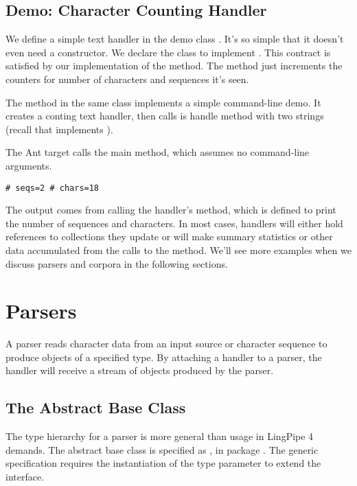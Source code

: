 \subsection{Demo: Character Counting Handler}

We define a simple text handler in the demo class
.  It's so simple that it doesn't
even need a constructor.
%
%
We declare the class to implement .
This contract is satisfied by our implementation of the
 method.  The method just increments the
counters for number of characters and sequences it's seen.

The  method in the same class implements a simple
command-line demo.  It creates a conting text handler, then calls is
handle method with two strings (recall that  implements
).
%

The Ant target  calls the main method,
which assumes no command-line arguments.  
%
\begin{verbatim}
# seqs=2 # chars=18
\end{verbatim}
%
The output comes from calling the handler's  method,
which is defined to print the number of sequences and characters.  In
most cases, handlers will either hold references to collections they
update or will make summary statistics or other data accumulated from
the calls to the  method.  We'll see more examples when
we discuss parsers and corpora in the following sections.




\section{Parsers}

A parser reads character data from an input source or character
sequence to produce objects of a specified type.  By attaching a
handler to a parser, the handler will receive a stream of
objects produced by the parser.

\subsection{The  Abstract Base Class}

The type hierarchy for a parser is more general than usage in LingPipe
4 demands.  The abstract base class is specified as , in package .  The generic
specification requires the instantiation of the type parameter
 to extend the  interface.  

